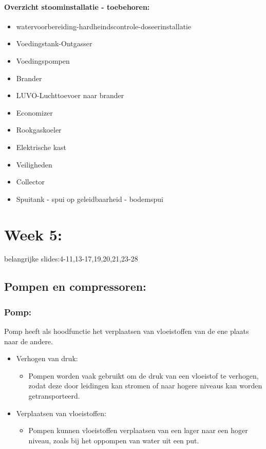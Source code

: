 \documentclass[12pt]{article}
\begin{document}
\paragraph{Overzicht stoominstallatie - toebehoren:}
\begin{itemize}
    \item watervoorbereiding-hardheindscontrole-doseerinstallatie
    \item Voedingstank-Ontgasser
    \item Voedingspompen
    \item Brander 
    \item LUVO-Luchttoevoer naar brander
    \item Economizer
    \item Rookgaskoeler
    \item Elektrische kast 
    \item Veiligheden 
    \item Collector 
    \item Spuitank - spui op geleidbaarheid - bodemspui
\end{itemize}
\section{Week 5:}
belangrijke slides:4-11,13-17,19,20,21,23-28
\subsection{Pompen en compressoren:}
\subsubsection{Pomp:}
Pomp heeft als hoodfunctie het verplaatsen van vloeistoffen van de ene plaats naar de andere.
\begin{itemize}
    \item Verhogen van druk:\begin{itemize}
        \item Pompen worden vaak gebruikt om de druk van een vloeistof te verhogen, zodat deze door leidingen kan stromen of naar hogere niveaus kan worden getransporteerd.
    \end{itemize}
    \item Verplaatsen van vloeistoffen:\begin{itemize}
        \item Pompen kunnen vloeistoffen verplaatsen van een lager naar een hoger niveau, zoals bij het oppompen van water uit een put.
    \end{itemize}
\end{itemize}
\end{document}

